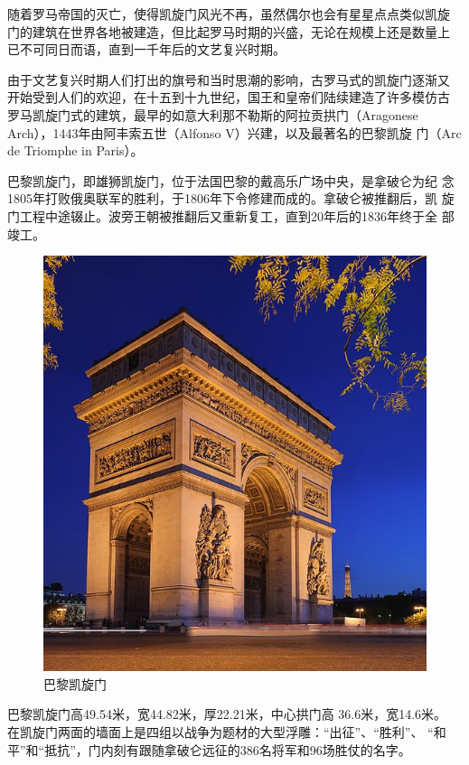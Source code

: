 \documentclass[a4paper,dvipdfm]{article}
\begin{document}
随着罗马帝国的灭亡，使得凯旋门风光不再，虽然偶尔也会有星星点点类似凯旋
门的建筑在世界各地被建造，但比起罗马时期的兴盛，无论在规模上还是数量上
已不可同日而语，直到一千年后的文艺复兴时期。

由于文艺复兴时期人们打出的旗号和当时思潮的影响，古罗马式的凯旋门逐渐又
开始受到人们的欢迎，在十五到十九世纪，国王和皇帝们陆续建造了许多模仿古
罗马凯旋门式的建筑，最早的如意大利那不勒斯的阿拉贡拱门（Aragonese
Arch），1443年由阿丰索五世（Alfonso V）兴建，以及最著名的巴黎凯旋
门（Arc de Triomphe in Paris）。

巴黎凯旋门，即雄狮凯旋门，位于法国巴黎的戴高乐广场中央，是拿破仑为纪
念1805年打败俄奥联军的胜利，于1806年下令修建而成的。拿破仑被推翻后，凯
旋门工程中途辍止。波旁王朝被推翻后又重新复工，直到20年后的1836年终于全
部竣工。


\begin{figure}[hbt!]
  \centering
  \includegraphics[width=\textwidth]{Arc_de_Triomphe}
  \caption{巴黎凯旋门}
  \label{fig:par}
\end{figure}


巴黎凯旋门高49.54米，宽44.82米，厚22.21米，中心拱门高 36.6米，宽14.6米。
在凯旋门两面的墙面上是四组以战争为题材的大型浮雕：``出征''、``胜利''、
``和平''和``抵抗''，门内刻有跟随拿破仑远征的386名将军和96场胜仗的名字。
\end{document}
